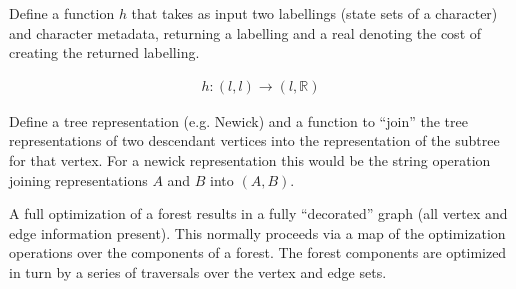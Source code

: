 \documentclass[11pt]{article}
\begin{document}
 Define a function $h$ that takes as input two labellings (state sets of a character) and character metadata, returning 
 a labelling and a real denoting the cost of creating the returned labelling.
 
     \begin{eqnarray*}
     	h : \left(l , l \right) \rightarrow \left( l ,  \mathbb{R} \right)
    \end{eqnarray*}

Define a tree representation (e.g. Newick) and a function to ``join'' the tree representations of two descendant vertices
into the representation of the subtree for that vertex.  For a newick representation this would be the string operation
joining representations $A$ and $B$ into $\left( A, B \right)$.

 A full optimization of a forest results in a fully ``decorated'' graph (all vertex and edge information present).  This normally
 proceeds via a map of the optimization operations over the components of a forest.  The forest components are optimized in turn
 by a series of traversals over the vertex and edge sets.
 
%
\end{document}
